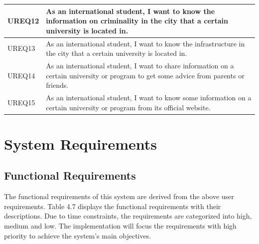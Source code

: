 \begin{table}[H]
\begin{tabular}{|p{2cm}|p{11cm}|}
UREQ12              & As an international student, I want to know the information on criminality in the city that a certain university is located in.         \\ \hline
UREQ13              & As an international student, I want to know the infrastructure in the city that a certain university is located in.                     \\ \hline
UREQ14              & As an international student, I want to share information on a certain university or program to get some advice from parents or friends. \\ \hline
UREQ15              & As an international student, I want to know some information on a certain university or program from its official website.              \\ \hline
\end{tabular}
\end{table}


\section{System Requirements
}

\subsection{Functional Requirements
}

The functional requirements of this system are derived from the above user requirements. Table 4.7 displays the functional requirements with their descriptions. Due to time constraints, the requirements are categorized into high, medium and low. The implementation will focus the requirements with high priority to achieve the system’s main objectives.

